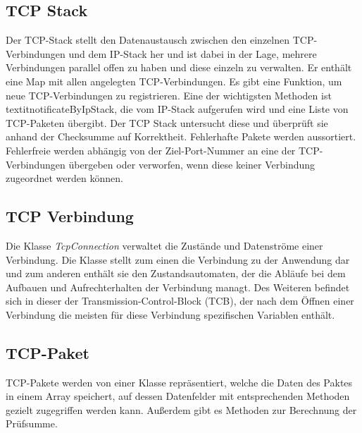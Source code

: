 \subsection{TCP Stack}
Der TCP-Stack stellt den Datenaustausch zwischen den einzelnen TCP-Verbindungen und dem IP-Stack her und ist dabei in der Lage, mehrere Verbindungen parallel offen zu haben und diese einzeln zu verwalten. 
Er enthält eine Map mit allen angelegten TCP-Verbindungen. Es gibt eine Funktion, um neue TCP-Verbindungen zu registrieren. Eine der wichtigsten Methoden ist textit{notificateByIpStack}, die vom IP-Stack aufgerufen wird und eine Liste von TCP-Paketen übergibt. Der TCP Stack untersucht diese und überprüft sie anhand der Checksumme auf Korrektheit. Fehlerhafte Pakete werden aussortiert. Fehlerfreie werden abhängig von der Ziel-Port-Nummer an eine der TCP-Verbindungen übergeben oder verworfen, wenn diese keiner Verbindung zugeordnet werden können.   

\subsection{TCP Verbindung}
Die Klasse \textit{TcpConnection} verwaltet die Zustände und Datenströme einer Verbindung. Die Klasse stellt zum einen die Verbindung zu der Anwendung dar und zum anderen enthält sie den Zustandsautomaten, der die Abläufe bei dem Aufbauen und Aufrechterhalten der Verbindung managt. Des Weiteren befindet sich in dieser der Transmission-Control-Block (TCB), der nach dem Öffnen einer Verbindung die meisten für diese Verbindung spezifischen Variablen enthält.   

\subsection{TCP-Paket}
TCP-Pakete werden von einer Klasse repräsentiert, welche die Daten des Paktes in einem Array speichert, auf dessen Datenfelder mit entsprechenden Methoden gezielt zugegriffen werden kann. Außerdem gibt es Methoden zur Berechnung der Prüfsumme.


